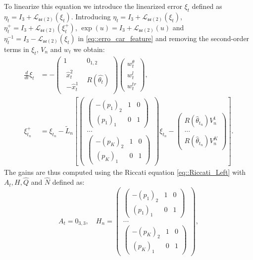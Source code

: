 \documentclass[a4paper,12pt,onecolumn]{article}
\begin{document}
To linearize this equation we introduce the linearized error $\xi_t$ defined as $\eta_t = I_3 + \mathcal{L}_{\mathfrak{se}(2)}(\xi_t)$. Introducing $\eta_t = I_3 + \mathcal{L}_{\mathfrak{se}(2)}(\xi_t)$, $\eta_t^+ = I_3 + \mathcal{L}_{\mathfrak{se}(2)}(\xi_t^+)$, $\exp(u)=I_3+\mathcal{L}_{\mathfrak{se}(2)}(u)$ and $\eta_t^{-1} = I_3 - \mathcal{L}_{\mathfrak{se}(2)}(\xi_t) $ in \eqref{eq::erro_car_feature} and removing the second-order terms in $\xi_t$, $V_n$ and $w_t$ we obtain:
\begin{align*}
\frac{d}{dt} \xi_t &  = - 
\begin{pmatrix}
1 & 0_{1,2} \\
\begin{matrix}
\hat{x}_t^2 \\
-\hat{x}_t^1
\end{matrix} & R(\hat{\theta_t})
\end{pmatrix} \begin{pmatrix} w_t^\theta \\ w_t^l \\ w_t^{tr} \end{pmatrix},\\
\xi_{t_n}^+ & = \xi_{t_n} - \tilde{L}_n \left[ \begin{pmatrix}
\begin{pmatrix}
-(p_1)_2 & 1 & 0 \\
 (p_1)_1 & 0 & 1
\end{pmatrix}  \\
 ... \\
\begin{pmatrix}
-(p_K)_2 & 1 & 0 \\
 (p_K)_1 & 0 & 1
\end{pmatrix}  
 \end{pmatrix} \xi_{t_n} -
 \begin{pmatrix}
 R(\hat{\theta}_{t_n})  V_n^1 \\
 ... \\
 R(\hat{\theta}_{t_n}) V_n^K
 \end{pmatrix} \right].
\end{align*}
 The gains are thus computed using the Riccati equation \eqref{eq::Riccati_Left} with $A_t,H, \hat{Q}$ and $\hat{N}$ defined as:
\[
A_t= 0_{3,3}, \quad H_n = \begin{pmatrix}
\begin{pmatrix}
-(p_1)_2 & 1 & 0 \\
 (p_1)_1 & 0 & 1
\end{pmatrix}  \\
 ... \\
\begin{pmatrix}
-(p_K)_2 & 1 & 0 \\
 (p_K)_1 & 0 & 1
\end{pmatrix}  
 \end{pmatrix},\]
\end{document}
